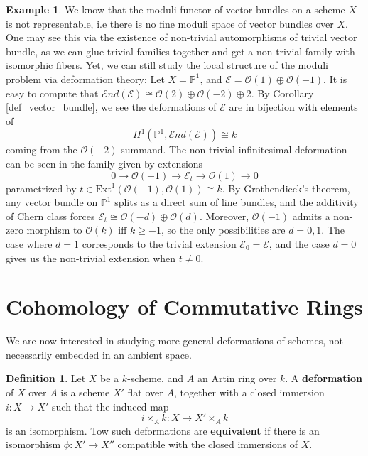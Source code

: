 \documentclass{article}
\renewcommand{\P}{\mathbb{P}}
\theoremstyle{definition}
\theoremstyle{definition}
\newtheorem{definition}{Definition}[theorem]
\theoremstyle{definition}
\theoremstyle{definition}
\theoremstyle{definition}
\theoremstyle{definition}
\theoremstyle{definition}
\newtheorem{example}{Example}[theorem]
\begin{document}
\begin{example}
	We know that the moduli functor of vector bundles on a scheme $X$ is not representable, i.e there is no fine moduli space of vector bundles over $X$. One may see this via the existence of non-trivial automorphisms of trivial vector bundle, as we can glue trivial families together and get a non-trivial family with isomorphic fibers. Yet, we can still study the local structure of the moduli problem via deformation theory: Let $X=\P ^1$, and $\mathcal{E}= \mathcal{O}(1)\oplus \mathcal{O}(-1)$. It is easy to compute that $\mathcal{E}nd(\mathcal{E})\cong \mathcal{O}(2)\oplus \mathcal{O}(-2)\oplus 2$. By Corollary \ref{def_vector_bundle}, we see the deformations of $\mathcal{E}$ are in bijection with elements of 
	\[ H^1(\P^1, \mathcal{E}nd(\mathcal{E}))\cong k\]
	coming from the $\mathcal{O}(-2)$ summand. The non-trivial infinitesimal deformation can be seen in the family given by extensions 
	\[0\to \mathcal{O}(-1)\to \mathcal{E}_t\to \mathcal{O}(1)\to 0\]
	parametrized by $t\in \textrm{Ext}^1(\mathcal{O}(-1), \mathcal{O}(1))\cong k$. By Grothendieck's theorem, any vector bundle on $\P^1$ splits as a direct sum of line bundles, and the additivity of Chern class forces $\mathcal{E}_t\cong \mathcal{O}(-d)\oplus \mathcal{O}(d)$. Moreover, $\mathcal{O}(-1)$ admits a non-zero morphism to $\mathcal{O}(k)$ iff $k\geq -1$, so the only possibilities are $d=0,1$. The case where $d=1$ corresponds to the trivial extension $\mathcal{E}_0=\mathcal{E}$, and the case $d=0$ gives us the non-trivial extension when $t\neq 0$. 


\end{example}

\section{Cohomology of Commutative Rings}
We are now interested in studying more general deformations of schemes, not necessarily embedded in an ambient space. 
\begin{definition}
	Let $X$ be a $k$-scheme, and $A$ an Artin ring over $k$. A \textbf{deformation} of $X$ over $A$ is a scheme $X'$ flat over $A$, together with a closed immersion $i: X\to X'$ such that the induced map 
	\[i\times_A k: X\to X'\times_A k\]
is an isomorphism. Tow such deformations are \textbf{equivalent} if there is an isomorphism $\phi: X'\to X''$ compatible with the closed immersions of $X$.



\end{definition}
\end{document}
